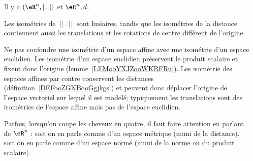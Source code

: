 
      \label{THMooVUCLooCrdbxm}

Il y a \( (\eR^n,\| . \|)\) et \( \eR^n,d\).

Les isométries de \( \| . \|\) sont linéaires, tandis que les isométries de la distance contiennent aussi les translations et les rotations de centre différent de l'origine.

Ne pas confondre une isométrie d'un espace affine avec une isométrie d'un espace euclidien. Les isométrie d'un espace euclidien préservent le produit scalaire et fixent donc l'origine (lemme~\ref{LEMooYXJZooWKRFRu}). Les isométrie des espaces affines par contre conservent les distances (définition~\ref{DEFooZGKBooGgjkgs}) et peuvent donc déplacer l'origine de l'espace vectoriel sur lequel il est modelé; typiquement les translations sont des isométries de l'espace affine mais pas de l'espace euclidien.

Parfois, lorsqu'on coupe les cheveux en quatre, il faut faire attention en parlant de \( \eR^n\) : soit on en parle comme d'un espace métrique (muni de la distance), soit on en parle comme d'un espace normé (muni de la norme ou du produit scalaire).

